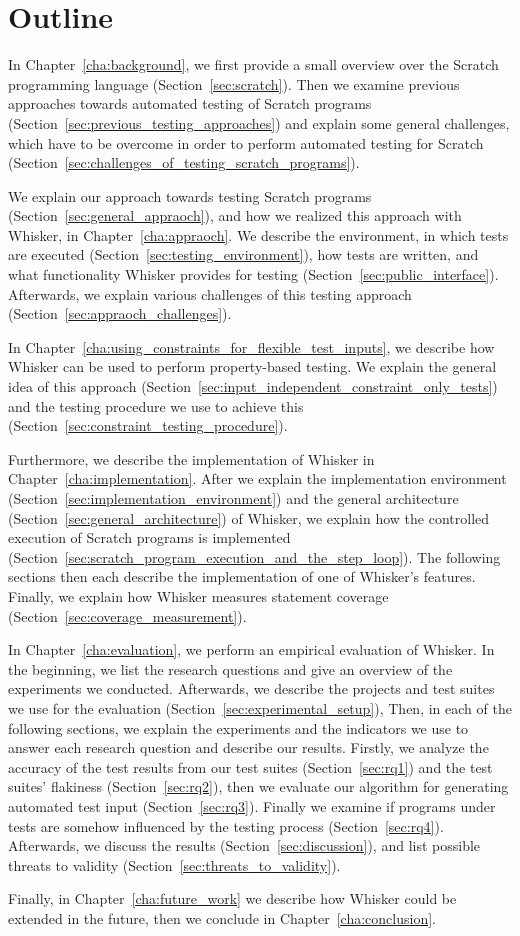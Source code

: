 \section{Outline}

In Chapter~\ref{cha:background}, we first provide a small overview over the Scratch programming language (Section~\ref{sec:scratch}).
Then we examine previous approaches towards automated testing of Scratch programs (Section~\ref{sec:previous_testing_approaches})
and explain some general challenges, which have to be overcome in order to perform automated testing for Scratch (Section~\ref{sec:challenges_of_testing_scratch_programs}).%
\parspace

We explain our approach towards testing Scratch programs (Section~\ref{sec:general_appraoch}),
and how we realized this approach with Whisker, in Chapter~\ref{cha:appraoch}.
We describe the environment, in which tests are executed (Section~\ref{sec:testing_environment}),
how tests are written, and what functionality Whisker provides for testing (Section~\ref{sec:public_interface}).
Afterwards, we explain various challenges of this testing approach (Section~\ref{sec:appraoch_challenges}).
\parspace

In Chapter~\ref{cha:using_constraints_for_flexible_test_inputs}, we describe how Whisker can be used to perform property-based testing.
We explain the general idea of this approach (Section~\ref{sec:input_independent_constraint_only_tests})
and the testing procedure we use to achieve this (Section~\ref{sec:constraint_testing_procedure}).
\parspace

Furthermore, we describe the implementation of Whisker in Chapter~\ref{cha:implementation}.
After we explain the implementation environment (Section~\ref{sec:implementation_environment})
and the general architecture (Section~\ref{sec:general_architecture}) of Whisker,
we explain how the controlled execution of Scratch programs is implemented (Section~\ref{sec:scratch_program_execution_and_the_step_loop}).
The following sections then each describe the implementation of one of Whisker's features.
Finally, we explain how Whisker measures statement coverage (Section~\ref{sec:coverage_measurement}).
\parspace

In Chapter~\ref{cha:evaluation}, we perform an empirical evaluation of Whisker.
In the beginning, we list the research questions and give an overview of the experiments we conducted.
Afterwards, we describe the projects and test suites we use for the evaluation (Section~\ref{sec:experimental_setup}),
Then, in each of the following sections,
we explain the experiments and the indicators we use to answer each research question and describe our results.
Firstly, we analyze the accuracy of the test results from our test suites (Section~\ref{sec:rq1}) and the test suites' flakiness (Section~\ref{sec:rq2}),
then we evaluate our algorithm for generating automated test input (Section~\ref{sec:rq3}).
Finally we examine if programs under tests are somehow influenced by the testing process (Section~\ref{sec:rq4}).
Afterwards, we discuss the results (Section~\ref{sec:discussion}),
and list possible threats to validity (Section~\ref{sec:threats_to_validity}).
\parspace

Finally, in Chapter~\ref{cha:future_work} we describe how Whisker could be extended in the future,
then we conclude in Chapter~\ref{cha:conclusion}.

